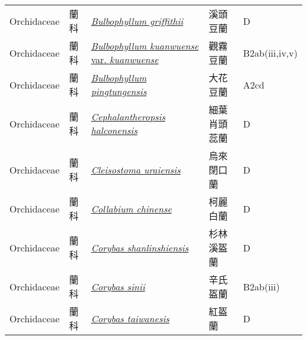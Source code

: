 {\begin{longtable}{L{2.5cm}L{2cm}L{5cm}L{2.5cm}L{3cm}}
    Orchidaceae & 蘭科 & \href{http://www.theplantlist.org/tpl1.1/search?q=Bulbophyllum+griffithii}{\textit{Bulbophyllum griffithii} } & 溪頭豆蘭 & D    \\
    Orchidaceae & 蘭科 & \href{http://www.theplantlist.org/tpl1.1/search?q=Bulbophyllum+kuanwuense+var.+kuanwuense}{\textit{Bulbophyllum kuanwuense} var. \textit{kuanwuense} } & 觀霧豆蘭 & B2ab(iii,iv,v)    \\
    Orchidaceae & 蘭科 & \href{http://www.theplantlist.org/tpl1.1/search?q=Bulbophyllum+pingtungensis}{\textit{Bulbophyllum pingtungensis} } & 大花豆蘭 & A2cd    \\
    Orchidaceae & 蘭科 & \href{http://www.theplantlist.org/tpl1.1/search?q=Cephalantheropsis+halconensis}{\textit{Cephalantheropsis halconensis} } & 細葉肖頭蕊蘭 & D    \\
    Orchidaceae & 蘭科 & \href{http://www.theplantlist.org/tpl1.1/search?q=Cleisostoma+uraiensis}{\textit{Cleisostoma uraiensis} } & 烏來閉口蘭 & D    \\
    Orchidaceae & 蘭科 & \href{http://www.theplantlist.org/tpl1.1/search?q=Collabium+chinense}{\textit{Collabium chinense} } & 柯麗白蘭 & D    \\
    Orchidaceae & 蘭科 & \href{http://www.theplantlist.org/tpl1.1/search?q=Corybas+shanlinshiensis}{\textit{Corybas shanlinshiensis} } & 杉林溪盔蘭 & D    \\
    Orchidaceae & 蘭科 & \href{http://www.theplantlist.org/tpl1.1/search?q=Corybas+sinii}{\textit{Corybas sinii} } & 辛氏盔蘭 & B2ab(iii)    \\
    Orchidaceae & 蘭科 & \href{http://www.theplantlist.org/tpl1.1/search?q=Corybas+taiwanesis}{\textit{Corybas taiwanesis} } & 紅盔蘭 & D    \\

\end{longtable}}

